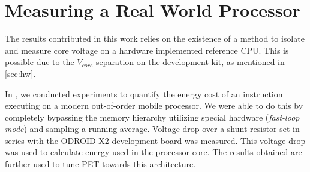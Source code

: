 \section{Measuring a Real World Processor}

The results contributed in this work relies on the existence of a method to
isolate and measure core voltage on a hardware implemented reference CPU. This
is possible due to the $V_{core}$ separation on the development kit, as
mentioned in \autoref{sec:hw}.

In \cite{rundehvatum2013exploring}, we conducted experiments to quantify the
energy cost of an instruction executing on a modern out-of-order mobile
processor. We were able to do this by completely bypassing the memory hierarchy
utilizing special hardware (\emph{fast-loop mode}) and sampling a running
average. Voltage drop over a shunt resistor set in series with the ODROID-X2
development board was measured. This voltage drop was used to calculate energy
used in the processor core. The results obtained are further used to tune PET
towards this architecture.
